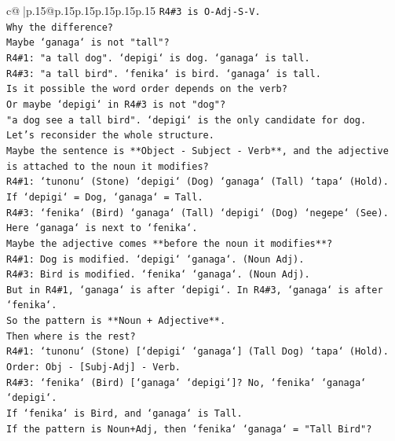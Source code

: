 \documentclass{article}
\begin{document}
{\begin{supertabular}{c@{$\;$}|p{.15\linewidth}@{}p{.15\linewidth}p{.15\linewidth}p{.15\linewidth}p{.15\linewidth}p{.15\linewidth}}
{{{\texttt{R4\#3 is O{-}Adj{-}S{-}V.} \\
\texttt{Why the difference?} \\
\texttt{Maybe `ganaga` is not "tall"?} \\
\texttt{R4\#1: "a tall dog". `depigi` is dog. `ganaga` is tall.} \\
\texttt{R4\#3: "a tall bird". `fenika` is bird. `ganaga` is tall.} \\
\texttt{Is it possible the word order depends on the verb?} \\
\texttt{Or maybe `depigi` in R4\#3 is not "dog"?} \\
\texttt{"a dog see a tall bird". `depigi` is the only candidate for dog.} \\
\texttt{Let's reconsider the whole structure.} \\
\texttt{Maybe the sentence is **Object {-} Subject {-} Verb**, and the adjective is attached to the noun it modifies?} \\
\texttt{R4\#1: `tunonu` (Stone) `depigi` (Dog) `ganaga` (Tall) `tapa` (Hold).} \\
\texttt{If `depigi` = Dog, `ganaga` = Tall.} \\
\texttt{R4\#3: `fenika` (Bird) `ganaga` (Tall) `depigi` (Dog) `negepe` (See).} \\
\texttt{Here `ganaga` is next to `fenika`.} \\
\texttt{Maybe the adjective comes **before the noun it modifies**?} \\
\texttt{R4\#1: Dog is modified. `depigi` `ganaga`. (Noun Adj).} \\
\texttt{R4\#3: Bird is modified. `fenika` `ganaga`. (Noun Adj).} \\
\texttt{But in R4\#1, `ganaga` is after `depigi`. In R4\#3, `ganaga` is after `fenika`.} \\
\texttt{So the pattern is **Noun + Adjective**.} \\
\texttt{Then where is the rest?} \\
\texttt{R4\#1: `tunonu` (Stone) {[}`depigi` `ganaga`{]} (Tall Dog) `tapa` (Hold).} \\
\texttt{Order: Obj {-} {[}Subj{-}Adj{]} {-} Verb.} \\
\texttt{R4\#3: `fenika` (Bird) {[}`ganaga` `depigi`{]}? No, `fenika` `ganaga` `depigi`.} \\
\texttt{If `fenika` is Bird, and `ganaga` is Tall.} \\
\texttt{If the pattern is Noun+Adj, then `fenika` `ganaga` = "Tall Bird"?} \\
}}}
\end{supertabular}}
\end{document}
